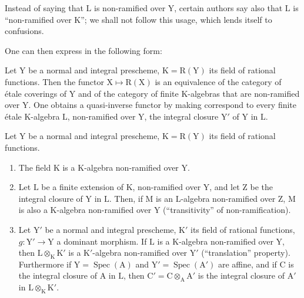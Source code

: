 \begin{remark}[18.10.11]
\label{IV.18.10.11}
Instead of saying that $\mathrm{L}$ is non-ramified over $\mathrm{Y}$, certain authors say also that $\mathrm{L}$ is ``non-ramified over $\mathrm{K}$''; we shall not follow this usage, which lends itself to confusions.
\end{remark}

One can then express  in the following form:

\begin{corollary}[18.10.12]
\label{IV.18.10.12}
Let $\mathrm{Y}$ be a normal and integral prescheme, $\mathrm{K}=\mathrm{R}(\mathrm{Y})$ its field of rational functions.
Then the functor $\mathrm{X}\mapsto\mathrm{R}(\mathrm{X})$ is an equivalence of the category of \'etale coverings of $\mathrm{Y}$ and of the category of finite $\mathrm{K}$-algebras that are non-ramified over $\mathrm{Y}$.
One obtains a quasi-inverse functor by making correspond to every finite \'etale $\mathrm{K}$-algebra $\mathrm{L}$, non-ramified over $\mathrm{Y}$, the integral closure $\mathrm{Y}'$ of $\mathrm{Y}$ in $\mathrm{L}$.
\end{corollary}

\begin{proposition}[18.10.13]
\label{IV.18.10.13}
Let $\mathrm{Y}$ be a normal and integral prescheme, $\mathrm{K}=\mathrm{R}(\mathrm{Y})$ its field of rational functions.
\begin{enumerate}[label=(\roman*)]
  \item The field $\mathrm{K}$ is a $\mathrm{K}$-algebra non-ramified over $\mathrm{Y}$.
  \item Let $\mathrm{L}$ be a finite extension of $\mathrm{K}$, non-ramified over $\mathrm{Y}$, and let $\mathrm{Z}$ be the integral closure of $\mathrm{Y}$ in $\mathrm{L}$.
Then, if $\mathrm{M}$ is an $\mathrm{L}$-algebra non-ramified over $\mathrm{Z}$, $\mathrm{M}$ is also a $\mathrm{K}$-algebra non-ramified over $\mathrm{Y}$ (``transitivity'' of non-ramification).
  \item Let $\mathrm{Y}'$ be a normal and integral prescheme, $\mathrm{K}'$ its field of rational functions, $g:\mathrm{Y}'\to\mathrm{Y}$ a dominant morphism.
If $\mathrm{L}$ is a $\mathrm{K}$-algebra non-ramified over $\mathrm{Y}$, then $\mathrm{L}\otimes_{\mathrm{K}}\mathrm{K}'$ is a $\mathrm{K}'$-algebra non-ramified over $\mathrm{Y}'$ (``translation'' property).
Furthermore if $\mathrm{Y}=\operatorname{Spec}(\mathrm{A})$ and $\mathrm{Y}'=\operatorname{Spec}(\mathrm{A}')$ are affine, and if $\mathrm{C}$ is the integral closure of $\mathrm{A}$ in $\mathrm{L}$, then $\mathrm{C}'=\mathrm{C}\otimes_{\mathrm{A}}\mathrm{A}'$ is the integral closure of $\mathrm{A}'$ in $\mathrm{L}\otimes_{\mathrm{K}}\mathrm{K}'$.
\end{enumerate}
\end{proposition}

